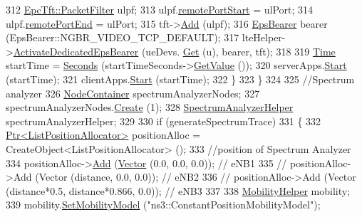 \begin{DoxyCode}
312           \hyperlink{structns3_1_1EpcTft_1_1PacketFilter}{EpcTft::PacketFilter} ulpf;
313           ulpf.\hyperlink{structns3_1_1EpcTft_1_1PacketFilter_aa96ab9356c91b14059220d00155c32b5}{remotePortStart} = ulPort;
314           ulpf.\hyperlink{structns3_1_1EpcTft_1_1PacketFilter_a4bcdd15a9526e27eabd474276f691cf1}{remotePortEnd} = ulPort;
315           tft->\hyperlink{classns3_1_1EpcTft_a1228456a8abbe48cbc89bbe2d2e9af48}{Add} (ulpf);
316           \hyperlink{structns3_1_1EpsBearer}{EpsBearer} bearer (EpsBearer::NGBR\_VIDEO\_TCP\_DEFAULT);
317           lteHelper->\hyperlink{classns3_1_1LteHelper_af28041edd4c96bde1a2e07c90e363dcc}{ActivateDedicatedEpsBearer} (ueDevs.
      \hyperlink{classns3_1_1NetDeviceContainer_a677d62594b5c9d2dea155cc5045f4d0b}{Get} (u), bearer, tft);
318 
319           \hyperlink{classns3_1_1Time}{Time} startTime = \hyperlink{group__timecivil_ga33c34b816f8ff6628e33d5c8e9713b9e}{Seconds} (startTimeSeconds->\hyperlink{classns3_1_1UniformRandomVariable_a03822d8c86ac51e9aa83bbc73041386b}{GetValue} ());
320           serverApps.\hyperlink{classns3_1_1ApplicationContainer_a8eff87926507020bbe3e1390358a54a7}{Start} (startTime);
321           clientApps.\hyperlink{classns3_1_1ApplicationContainer_a8eff87926507020bbe3e1390358a54a7}{Start} (startTime);
322         \}
323     \}
324 
325   \textcolor{comment}{//Spectrum analyzer}
326   \hyperlink{classns3_1_1NodeContainer}{NodeContainer} spectrumAnalyzerNodes;
327   spectrumAnalyzerNodes.\hyperlink{classns3_1_1NodeContainer_a787f059e2813e8b951cc6914d11dfe69}{Create} (1);
328   \hyperlink{classns3_1_1SpectrumAnalyzerHelper}{SpectrumAnalyzerHelper} spectrumAnalyzerHelper;
329 
330   \textcolor{keywordflow}{if} (generateSpectrumTrace)
331     \{
332       \hyperlink{classns3_1_1Ptr}{Ptr<ListPositionAllocator>} positionAlloc = 
      CreateObject<ListPositionAllocator> ();
333       \textcolor{comment}{//position of Spectrum Analyzer}
334       positionAlloc->\hyperlink{classns3_1_1ListPositionAllocator_a460e82f015ac012a73ba0ea0cccb3486}{Add} (\hyperlink{classns3_1_1Vector3D_a7e59b47bc94c9cb1dadff68c1d0112d8}{Vector} (0.0, 0.0, 0.0));                              \textcolor{comment}{// eNB1}
335 \textcolor{comment}{//      positionAlloc->Add (Vector (distance,  0.0, 0.0));                        // eNB2}
336 \textcolor{comment}{//      positionAlloc->Add (Vector (distance*0.5, distance*0.866, 0.0));          // eNB3}
337 
338       \hyperlink{classns3_1_1MobilityHelper}{MobilityHelper} mobility;
339       mobility.\hyperlink{classns3_1_1MobilityHelper_a030275011b6f40682e70534d30280aba}{SetMobilityModel} (\textcolor{stringliteral}{"ns3::ConstantPositionMobilityModel"});

\end{DoxyCode}
